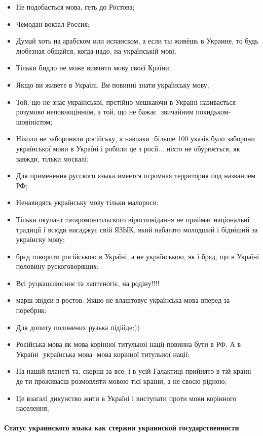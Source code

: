 \begin{itemize} %
\item Не подобається мова, геть до Ростова; 
\item Чемодан-вокзал-Россия;
\item Думай хоть на арабском или испанском, а если ты живёшь в Украине, то будь
любезная общайся, когда надо, на українській мові;
\item Тільки бидло не може вивчити мову своєї Країни;
\item Якщо ви живете в Україні, Ви повинні знати українську мову;
\item Той, що не знає української, прстійно мешкаючи в Україні називається розумово неповноцінним, а той, що не бажає ­ звичайним покидьком­шовіністом;
\item Ніколи не забороняли російську, а навпаки ­ більше 100 указів було заборони української мови в Україні і робили це з росії... ніхто не обурюється, як завжди, тільки москалі;
\item Для применения русского языка имеется огромная территория под названием РФ;
\item Ненавидять українську мову тільки малороси;
\item Тільки окупант татаромонгольского віросповідання не приймає національні традиції і всюди насаджує свій ЯЗЫК, який набагато молодший і бідніший за українску мову;
\item брєд говорити російською в Україні, а не українською, як і брєд, що в Україні половину рускоговорящих;
\item Всі руцкацєлюсниє та лаптєногіє, на родіну!!!!
\item марш звідси в ростов. Якшо не влаштовує українська мова вперед за поребрик;
\item Для допиту полонених рузька підійде:))
\item Російська мова як мова корінної титульної нації повинна бути в РФ. А в Україні ­ українська мова ­ мова корінної титульної нації;
\item На нашій планеті та, скоріш за все, і в усій Галактиці прийнято в тій країні де ти проживаєш розмовляти мовою тієї країни, а не своєю рідною;
\item Це взагалі дикунство жити в Україні і виступати проти мови корінного населення;
\end{itemize} %

\paragraph{Статус украинского языка как стержня украинской государственности}

